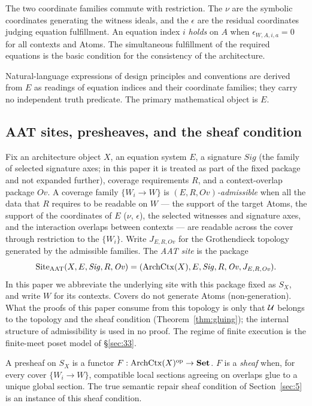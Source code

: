 The two coordinate families commute with restriction. The $\nu$ are the
symbolic coordinates generating the witness ideals, and the $\epsilon$
are the residual coordinates judging equation fulfillment. An equation
index $i$ \emph{holds} on $A$ when $\epsilon_{W,A,i,a}=0$ for all
contexts and Atoms. The simultaneous fulfillment of the required
equations is the basic condition for the consistency of the architecture.

Natural-language expressions of design principles and conventions are
derived from $E$ as readings of equation indices and their coordinate
families; they carry no independent truth predicate. The primary
mathematical object is $E$.

\subsection{AAT sites, presheaves, and the sheaf condition}\label{sec:35}

\begin{definition}\label{def:aatsite}
Fix an architecture object $X$, an equation system $E$, a signature
$\mathit{Sig}$ (the family of selected signature axes; in this paper it
is treated as part of the fixed package and not expanded further),
coverage requirements $R$, and a context-overlap package $\mathit{Ov}$.
A coverage family $\{W_i\to W\}$ is \emph{$(E,R,\mathit{Ov})$-admissible}
when all the data that $R$ requires to be readable on $W$ --- the support
of the target Atoms, the support of the coordinates of $E$ ($\nu$,
$\epsilon$), the selected witnesses and signature axes, and the
interaction overlaps between contexts --- are readable across the cover
through restriction to the $\{W_i\}$. Write $J_{E,R,\mathit{Ov}}$ for the
Grothendieck topology generated by the admissible families. The
\emph{AAT site} is the package
\[
\mathrm{Site}_{\mathrm{AAT}}(X,E,\mathit{Sig},R,\mathit{Ov})
=(\mathrm{ArchCtx}(X), E, \mathit{Sig}, R, \mathit{Ov}, J_{E,R,\mathit{Ov}}).
\]
In this paper we abbreviate the underlying site with this package fixed
as $S_X$, and write $W$ for its contexts. Covers do not generate Atoms
(non-generation). What the proofs of this paper consume from this
topology is only that $\mathcal{U}$ belongs to the topology and the sheaf
condition (Theorem~\ref{thm:gluing}); the internal structure of
admissibility is used in no proof. The regime of finite execution is the
finite-meet poset model of \S\ref{sec:33}.
\end{definition}

\begin{definition}\label{def:presheaf}
A presheaf on $S_X$ is a functor $F:\mathrm{ArchCtx}(X)^{\mathrm{op}}\to
\mathbf{Set}$. $F$ is a \emph{sheaf} when, for every cover
$\{W_i\to W\}$, compatible local sections agreeing on overlaps glue to a
unique global section. The true semantic repair sheaf condition of
Section~\ref{sec:5} is an instance of this sheaf condition.
\end{definition}

